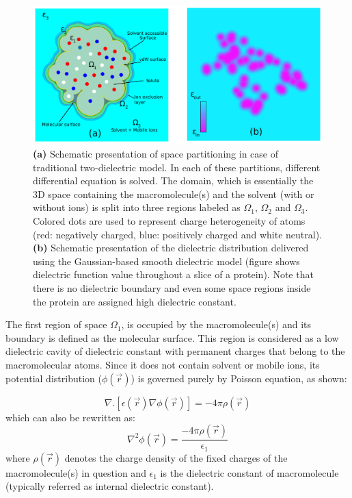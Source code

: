 \documentclass[9pt,tutorial,pubversion]{livecoms}
\begin{document}
\begin{figure}[hbt!]
\includegraphics[width=0.95\linewidth]{Figure_1.png}
\caption{\textbf{(a)} Schematic presentation of space partitioning in case of traditional two-dielectric model. In each of these partitions, different differential equation is solved. The domain, which is essentially the 3D space containing the macromolecule(s) and the solvent (with or without ions) is split into three regions labeled as $ \Omega_1$, $ \Omega_2 $ and $ \Omega_3 $. Colored dots are used to represent charge heterogeneity of atoms (red: negatively charged, blue: positively charged and white neutral). \textbf{(b)} Schematic presentation of the dielectric distribution delivered using the Gaussian-based smooth dielectric model (figure shows dielectric function value throughout a slice of a protein). Note that there is no dielectric boundary and even some space regions inside the protein are assigned high dielectric constant.}
\label{fig:Figure_1}
\end{figure}

The first region of space $ \Omega_1 $, is occupied by the macromolecule(s) and its boundary is defined as the molecular surface. This region is considered as a low dielectric cavity of dielectric constant with permanent charges that belong to the macromolecular atoms. Since it does not contain solvent or mobile ions, its potential distribution ($\phi(\Vec{r})$) is governed purely by Poisson equation, as shown:

\begin{equation}
 \nabla . \left[ \epsilon(\Vec{r})\nabla\phi(\Vec{r}) \right] = -4\pi\rho(\Vec{r})    
\end{equation} 
which can also be rewritten as:
\begin{equation}
\nabla^2\phi(\Vec{r}) = \frac{-4\pi\rho(\Vec{r})}{\epsilon_1} 
\end{equation}
where $ \rho(\Vec{r}) $ denotes the charge density of the fixed charges of the macromolecule(s) in question and $ \epsilon_1 $ is the dielectric constant of macromolecule (typically referred as internal dielectric constant). 
\end{document}
